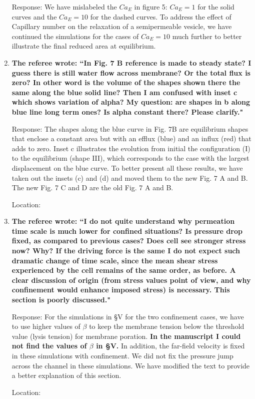 \documentclass[12pt]{article}
\begin{document}
\begin{enumerate}
\noindent
Response: We have mislabeled the $Ca_E$ in figure 5:  $Ca_E=1$ for the solid curves and the $Ca_E=10$ for the dashed curves. To address the effect of Capillary number on the relaxation of a semipermeable vesicle, we have continued the simulations for the cases of $Ca_E = 10$ much further to better illustrate the final reduced area at equilibrium.

\item{\bf
The referee wrote:
``In Fig. 7 B reference is made to steady state? I guess there is
still water flow across membrane? Or the total flux is zero? In other
word is the volume of the shapes shown there the same along the blue
solid line? Then I am confused with inset c which shows variation of
alpha? My question: are shapes in b along blue line long term ones? Is
alpha constant there? Please clarify."}

\noindent
Response: The shapes along the blue curve in Fig. 7B are equilibrium shapes that enclose a constant area but with an efflux (blue) and an influx (red) that adds to zero. Inset c illustrates the evolution from initial  the configuration (I) to the equilibrium (shape III), which corresponds to the case with the largest displacement on the blue curve. To better present all these results, we have taken out the insets (c) and (d) and moved them to the new Fig. 7 A and B. The new Fig. 7 C and D are the old Fig.  7 A and B.

\noindent
Location:

\item{\bf
The referee wrote:
``I do not quite understand why permeation time scale is much lower
for confined situations? Is pressure drop fixed, as compared to
previous cases? Does cell see stronger stress now? Why? If the driving
force is the same I do not expect such dramatic change of time scale,
since the mean shear stress experienced by the cell remains of the
same order, as before. A clear discussion of origin (from stress
values point of view, and why confinement would enhance imposed
stress) is necessary. This section is poorly discussed."}

\noindent
Response:  For the simulations in \S V for the two confinement cases, we have to use higher values of $\beta$ to keep the membrane tension below the threshold value (lysis tension) for membrane poration. {\bf In the manuscript I could not find the values of $\beta$ in \S V.} In addition, the far-field velocity is fixed in these simulations with confinement. We did not fix the pressure jump across the channel in these simulations. We have modified the text to provide a better explanation of this section.

\noindent
Location:

\end{enumerate}
\end{document}
